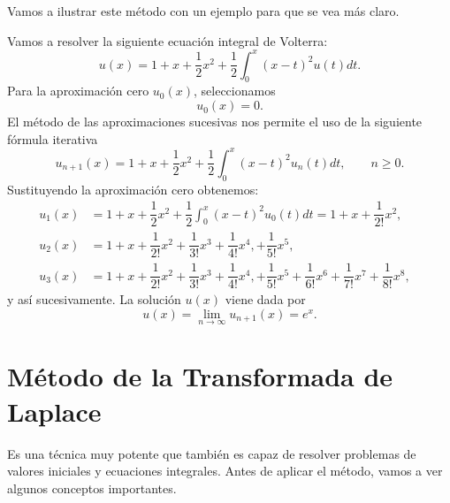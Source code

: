 Vamos a ilustrar este método con un ejemplo para que se vea más claro.
\begin{ejemplo}
	Vamos a resolver la siguiente ecuación integral de Volterra:
	\begin{equation}
		u(x) = 1 + x + \dfrac{1}{2}x^2 + \dfrac{1}{2}\int_{0}^{x}(x-t)^2u(t)dt.
	\end{equation}
	Para la aproximación cero $u_0(x)$, seleccionamos
	\begin{equation}
		u_0(x) = 0.
	\end{equation}
	El método de las aproximaciones sucesivas nos permite el uso de la siguiente fórmula iterativa
	\begin{equation}
		u_{n+1}(x) = 1 + x + \dfrac{1}{2}x^2 + \dfrac{1}{2}\int_{0}^{x}(x-t)^2u_n(t)dt, \qquad n \geqslant 0.
	\end{equation}
	Sustituyendo la aproximación cero obtenemos:
	\begin{align}
		u_1(x) &= 1 + x + \dfrac{1}{2}x^2 + \dfrac{1}{2}\int_{0}^{x}(x-t)^2u_0(t)dt = 1 + x + \dfrac{1}{2!}x^2,   & \\
		u_2(x) &= 1 + x + \dfrac{1}{2!}x^2 + \dfrac{1}{3!}x^3 + \dfrac{1}{4!}x^4, + \dfrac{1}{5!}x^5,   & \\
		u_3(x) &= 1 + x + \dfrac{1}{2!}x^2 + \dfrac{1}{3!}x^3 + \dfrac{1}{4!}x^4, + \dfrac{1}{5!}x^5 + \dfrac{1}{6!}x^6 + \dfrac{1}{7!}x^7 + \dfrac{1}{8!}x^8,     &
	\end{align}
	y así sucesivamente. La solución $u(x)$ viene dada por
	\begin{equation}
		u(x) = \lim_{n \rightarrow \infty} u_{n+1}(x) = e^x.
	\end{equation}
\end{ejemplo}

\section{Método de la Transformada de Laplace}
Es una técnica muy potente que también es capaz de resolver problemas de valores iniciales y ecuaciones integrales. Antes de aplicar el método, vamos a ver algunos conceptos importantes.

